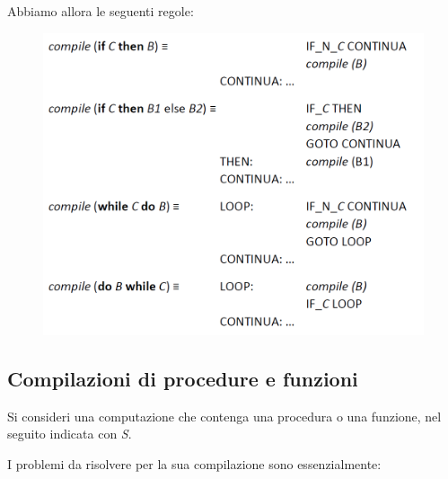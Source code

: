 Abbiamo allora le seguenti regole:

\begin{figure}[H]
    \centering
    \includegraphics[width=\textwidth]{immagini/Regole.png}
\end{figure}

\subsection{Compilazioni di procedure e funzioni}

Si consideri una computazione che contenga una procedura o una funzione, nel seguito indicata con \textit{S}.

I problemi da risolvere per la sua compilazione sono essenzialmente:

